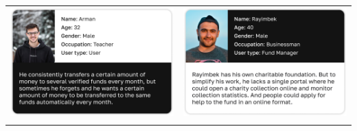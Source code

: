     \begin{center}
        \begin{tabular}{ c  c }
            \begin{minipage}{0.2\textwidth}
                \includegraphics[scale=0.2]{figures/userPersonas/User-persona 01.jpg}
            \end{minipage} \hspace*{0.5cm} & \begin{minipage}{0.2\textwidth}
                    \includegraphics[scale=0.2]{figures/userPersonas/User-persona 02.jpg}
                \end{minipage}   \\
            \begin{minipage}{0.2\textwidth}

\end{minipage}
\end{tabular}
\end{center}
